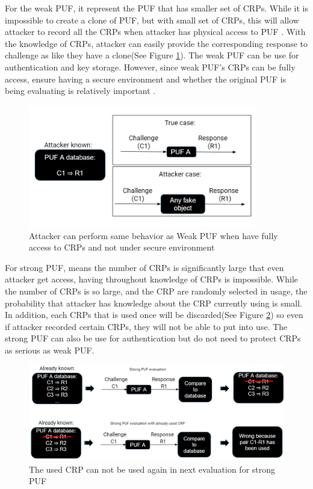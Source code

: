 For the weak PUF, it represent the PUF that has smaller set of CRPs. While it is impossible to 
create a clone of PUF, but with small set of CRPs, this will allow attacker to record all the CRPs when attacker has physical access to PUF \cite{Reference1}. With the knowledge of CRPs, attacker can easily provide the corresponding
response to challenge as like they have a clone(See Figure \ref{fig:figure2}). The weak PUF can be use for authentication and key storage. However, since weak PUF's CRPs can be fully access, ensure having a secure environment and whether the original PUF is being evaluating is relatively important \cite{Reference1}.
\begin{figure}[ht]
    \centering
    \includegraphics[width=10cm]{figures/figure2.jpg}
    \caption{Attacker can perform same behavior as Weak PUF when have fully access to CRPs and not under secure environment}
    \label{fig:figure2}
    \end{figure}

For strong PUF, means the number of CRPs is significantly large that even attacker get access, having throughout knowledge of CRPs is impossible. While the number of CRPs is so large,
and the CRP are randomly selected in usage, the probability that attacker has knowledge about the CRP currently using is small. In addition, each CRPs that is used once will 
be discarded(See Figure \ref{fig:figure3}) so even if attacker recorded certain CRPs, they will not be able to put into use. The strong PUF can also be use for authentication but do not need to protect CRPs
as serious as weak PUF.

\begin{figure}[ht]
    \centering
    \includegraphics[width=15cm]{figures/figure3.jpg}
    \caption{The used CRP can not be used again in next evaluation for strong PUF}
    \label{fig:figure3}
    \end{figure}

